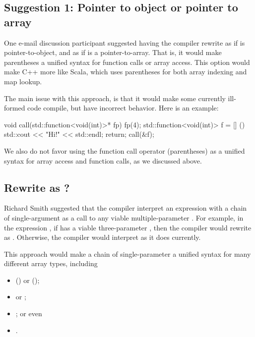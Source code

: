 \documentclass{wg21}
\begin{document}
\subsection{Suggestion 1: Pointer to object or pointer to array}

One e-mail discussion participant suggested having the compiler rewrite  as  if  is pointer-to-object, and  as  if  is a pointer-to-array.  That is, it would make parentheses a unified syntax for function calls or array access.  This option would make C++ more like Scala, which uses parentheses for both array indexing and map lookup.

The main issue with this approach, is that it would make some currently ill-formed code compile, but have incorrect behavior.  Here is an example:

\begin{colorblock}
void call(std::function<void(int)>* fp) {
    fp(4);
}
std::function<void(int)> f = [] () {
    std::cout << "Hi!" << std::endl;
    return;
}
call(&f);
\end{colorblock}

We also do not favor using the function call operator (parentheses) as a unified syntax for array access and function calls, as we discussed above.

\subsection{Rewrite \tcode{a[x][y]][z]} as ?}

Richard Smith suggested that the compiler interpret an expression with a chain of single-argument  as a call to any viable multiple-parameter .  For example, in the expression , if  has a viable three-parameter , then the compiler would rewrite  as .  Otherwise, the compiler would interpret  as it does currently.  

This approach would make a chain of single-parameter  a unified syntax for many different array types, including

\begin{itemize}
\item {} () or  ();
\item {} or ;
\item {}; or even
\item {}.
\end{itemize}
\end{document}
